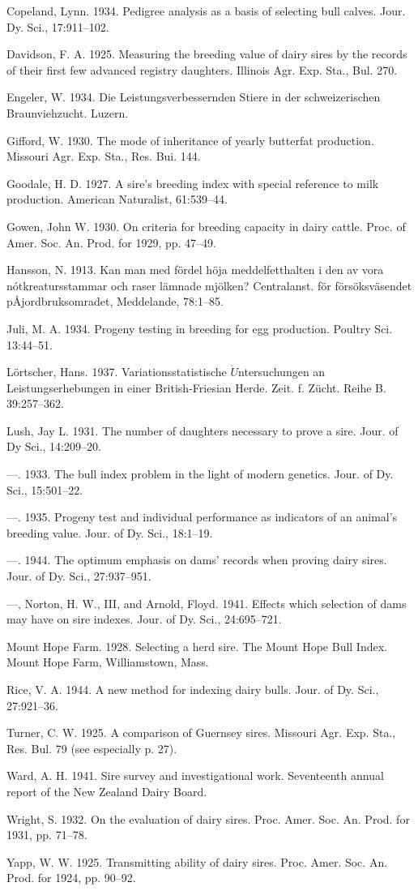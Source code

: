 \begin{hangparas}{0.5in}{1}%
Copeland, Lynn. 1934. Pedigree analysis as a basis of selecting bull calves. Jour.
Dy. Sci., 17:911--102.

Davidson, F. A. 1925. Measuring the breeding value of dairy sires by the records of
their first few advanced registry daughters. Illinois Agr. Exp. Sta., Bul. 270.

Engeler, W. 1934. Die Leistungsverbessernden Stiere in der schweizerischen Braunviehzucht.
Luzern.

Gifford, W. 1930. The mode of inheritance of yearly butterfat production. Missouri
Agr. Exp. Sta., Res. Bui. 144.

Goodale, H. D. 1927. A sire's breeding index with special reference to milk production.
American Naturalist, 61:539--44.

Gowen, John W. 1930. On criteria for breeding capacity in dairy cattle. Proc. of
Amer. Soc. An. Prod. for 1929, pp. 47--49.

Hansson, N. 1913. Kan man med f\"ordel h\"oja meddelfetthalten i den av vora
n\'{o}tkreatursstammar och raser l\"{a}mnade mj\"olken? Centralanst. f\"or
f\"ors\"oksv\"asendet p\AA jordbruksomradet, Meddelande, 78:1--85.

Juli, M. A. 1934. Progeny testing in breeding for egg production. Poultry Sci.
13:44--51.

L\"{o}rtscher, Hans. 1937. Variationsstatistische $\grave{U}$ntersuchungen an
Leistungserhebungen in einer British-Friesian Herde. Zeit. f. Z\"ucht. Reihe B.
39:257--362.

Lush, Jay L. 1931. The number of daughters necessary to prove a sire. Jour. of
Dy Sci., 14:209--20.

---. 1933. The bull index problem in the light of modern genetics. Jour. of
Dy. Sci., 15:501--22.

---. 1935. Progeny test and individual performance as indicators of an animal's
breeding value. Jour. of Dy. Sci., 18:1--19.

---. 1944. The optimum emphasis on dams' records when proving dairy
sires. Jour. of Dy. Sci., 27:937--951.

---, Norton, H. W., III, and Arnold, Floyd. 1941. Effects which selection of
dams may have on sire indexes. Jour. of Dy. Sci., 24:695--721.

Mount Hope Farm. 1928. Selecting a herd sire. The Mount Hope Bull Index. Mount
Hope Farm, Williamstown, Mass.

Rice, V. A. 1944. A new method for indexing dairy bulls. Jour. of Dy. Sci.,
27:921--36.

Turner, C. W. 1925. A comparison of Guernsey sires. Missouri Agr. Exp. Sta., Res.
Bul. 79 (see especially p. 27).

Ward, A. H. 1941. Sire survey and investigational work. Seventeenth annual report
of the New Zealand Dairy Board.

Wright, S. 1932. On the evaluation of dairy sires. Proc. Amer. Soc. An. Prod. for
1931, pp. 71--78.

Yapp, W. W. 1925. Transmitting ability of dairy sires. Proc. Amer. Soc. An. Prod.
for 1924, pp. 90--92.
\end{hangparas}

